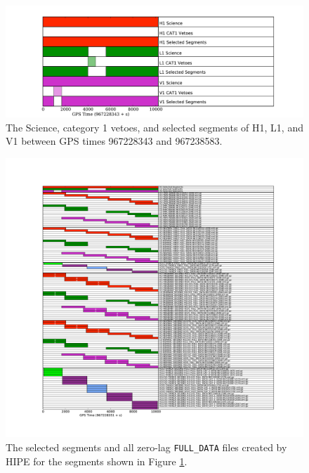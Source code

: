 \begin{figure}[p]
\label{fig:science-selected_segs}
\begin{center}
\includegraphics[width=6in]{figures/segment_plot_science-selected.pdf}
\end{center}
\caption{
The Science, category 1 vetoes, and selected segments of H1, L1, and V1 between GPS times 967228343 and 967238583.}
\end{figure}

\begin{figure}[p]
\label{fig:segment_plot_full}
\includegraphics[width=6.5in]{figures/segment_plot_selected_segs-thinca_second.pdf}
\caption{
The selected segments and all zero-lag \texttt{FULL\_DATA} files created by \ac{HIPE} for the segments shown in Figure \ref{fig:science-selected_segs}.}
\end{figure}
